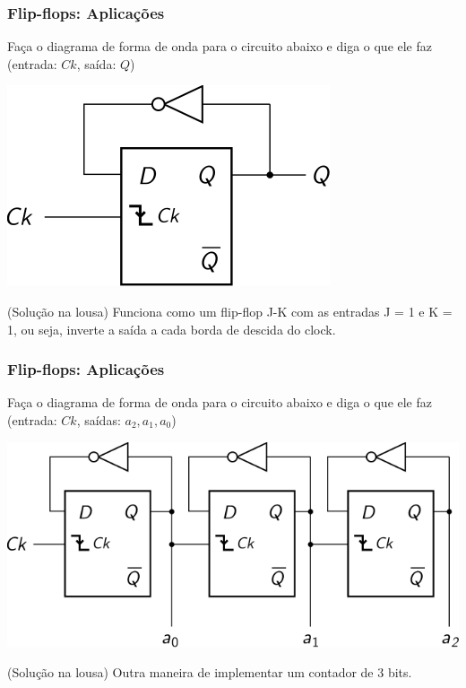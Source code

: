 \documentclass{beamer}
\begin{document}
\begin{frame}
\frametitle{Flip-flops: Aplicações}

Faça o diagrama de forma de onda para o circuito abaixo
e diga o que ele faz (entrada: $Ck$, saída: $Q$)

\begin{center}
\includegraphics{images/flipflopT}
\end{center}


(Solução na lousa) \pause Funciona como um flip-flop J-K
com as entradas J = 1 e K = 1, ou seja, inverte a saída
a cada borda de descida do clock.

\end{frame}

\begin{frame}
\frametitle{Flip-flops: Aplicações}

Faça o diagrama de forma de onda para o circuito abaixo
e diga o que ele faz (entrada: $Ck$, saídas: $a_2, a_1, a_0$)

\begin{center}
\includegraphics{images/flipflopTcounter}
\end{center}

(Solução na lousa) \pause Outra maneira de implementar
um contador de $3$ bits.

\end{frame}
\end{document}
